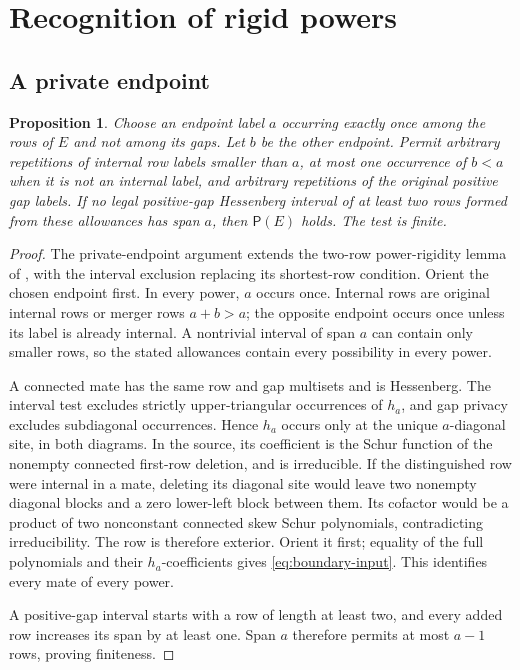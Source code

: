 \documentclass[11pt,a4paper]{amsart}
\numberwithin{equation}{section}
\theoremstyle{plain}
\newtheorem{proposition}[theorem]{Proposition}
\theoremstyle{definition}
\begin{document}
\section{Recognition of rigid powers}\label{sec:recognition}

\subsection{A private endpoint}

\begin{proposition}\label{prop:arithmetic-recognition}
Choose an endpoint label \(a\) occurring exactly once among the rows of \(E\) and not among its gaps.  Let \(b\) be the other endpoint.  Permit arbitrary repetitions of internal row labels smaller than \(a\), at most one occurrence of \(b<a\) when it is not an internal label, and arbitrary repetitions of the original positive gap labels.  If no legal positive-gap Hessenberg interval of at least two rows formed from these allowances has span \(a\), then \(\mathsf P(E)\) holds.  The test is finite.
\end{proposition}
\begin{proof}
The private-endpoint argument extends the two-row power-rigidity lemma of \cite{Shields2026Inflation}, with the interval exclusion replacing its shortest-row condition.  Orient the chosen endpoint first.  In every power, \(a\) occurs once.  Internal rows are original internal rows or merger rows \(a+b>a\); the opposite endpoint occurs once unless its label is already internal.  A nontrivial interval of span \(a\) can contain only smaller rows, so the stated allowances contain every possibility in every power.

A connected mate has the same row and gap multisets and is Hessenberg.  The interval test excludes strictly upper-triangular occurrences of \(h_a\), and gap privacy excludes subdiagonal occurrences.  Hence \(h_a\) occurs only at the unique \(a\)-diagonal site, in both diagrams.  In the source, its coefficient is the Schur function of the nonempty connected first-row deletion, and is irreducible.  If the distinguished row were internal in a mate, deleting its diagonal site would leave two nonempty diagonal blocks and a zero lower-left block between them.  Its cofactor would be a product of two nonconstant connected skew Schur polynomials, contradicting irreducibility.  The row is therefore exterior.  Orient it first; equality of the full polynomials and their \(h_a\)-coefficients gives \eqref{eq:boundary-input}.  This identifies every mate of every power.

A positive-gap interval starts with a row of length at least two, and every added row increases its span by at least one.  Span \(a\) therefore permits at most \(a-1\) rows, proving finiteness.
\end{proof}
\end{document}
